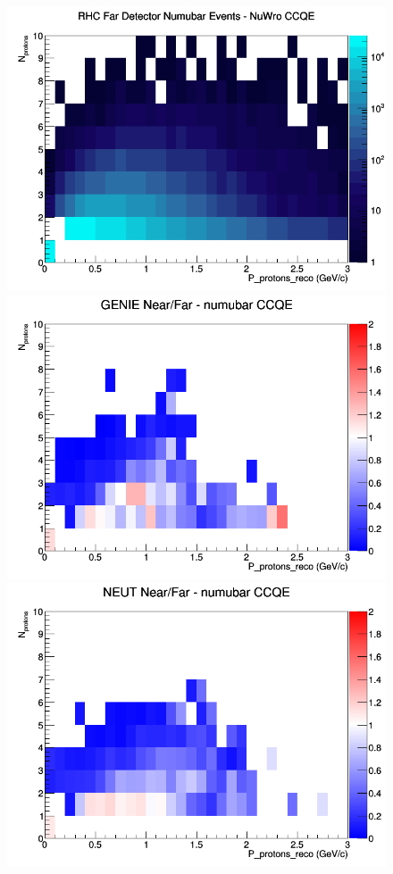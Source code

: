 \begin{figure}[h]
\endminipage
{}
\includegraphics[width=\linewidth]{eff_N_P/FGT/protons/CCQE_RHC_FD_numubar_N_P_NuWro.png}
\endminipage
\newline
{}
\includegraphics[width=\linewidth]{eff_N_P/FGT/protons/ratios/CCQE_GENIE_numubar_NF_N_P.png}
\endminipage
{}
\includegraphics[width=\linewidth]{eff_N_P/FGT/protons/ratios/CCQE_NEUT_numubar_NF_N_P.png}

\end{figure}
